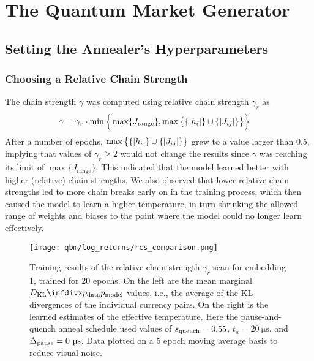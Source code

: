 \section{The Quantum Market Generator}
\subsection{Setting the Annealer's Hyperparameters}
\subsubsection{Choosing a Relative Chain Strength}
The chain strength \( \gamma \) was computed using relative chain strength \( \gamma_r \) as
\begin{align}
    \gamma
        &= \gamma_r \cdot \min\Big\{
            \max\{J_\text{range}\}, \max\big\{\{\lvert h_i\rvert\} \cup \{\lvert J_{ij}\rvert\}\big\}
        \Big\}
\end{align}
After a number of epochs, \( \max\big\{ \{\lvert h_i\rvert\} \cup \{\lvert J_{ij}\rvert\} \big\} \) grew to a value larger than 0.5, implying that values of \( \gamma_r \ge 2 \) would not change the results since \( \gamma \) was reaching its limit of \( \max\{J_\text{range}\} \).
This indicated that the model learned better with higher (relative) chain strengths.
We also observed that lower relative chain strengths led to more chain breaks early on in the training process, which then caused the model to learn a higher temperature, in turn shrinking the allowed range of weights and biases to the point where the model could no longer learn effectively.

\begin{figure}[!htb]
    \begin{center}
        \texttt{[image: qbm/log\_returns/rcs\_comparison.png]}
    \end{center}
    \caption{
        Training results of the relative chain strength \( \gamma_r \) scan for embedding 1, trained for 20 epochs.
        On the left are the mean marginal \( \DKL{\pdata}{\pmodel} \) values, i.e., the average of the KL divergences of the individual currency pairs.
        On the right is the learned estimates of the effective temperature.
        Here the pause-and-quench anneal schedule used values of \( s_{\text{quench}} = 0.55 \), \( t_a = 20 \ \si{\micro\second} \), and \( \Deltapause = 0 \ \si{\micro\second} \).
        Data plotted on a 5 epoch moving average basis to reduce visual noise.
    }
    \label{fig:qbm_log_returns_rcs_comparison}
\end{figure}

